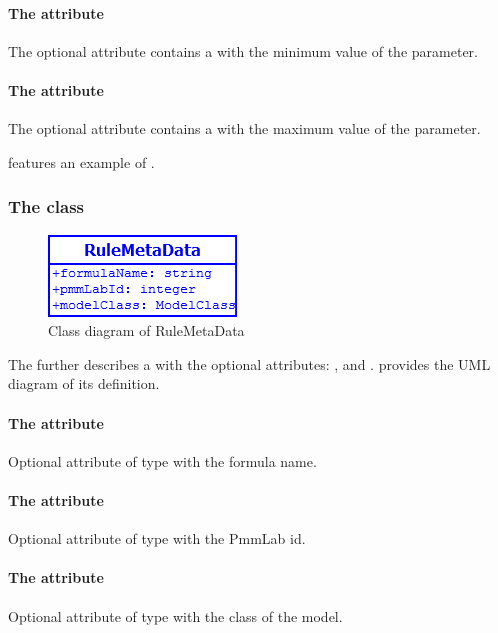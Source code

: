 \paragraph{The  attribute}
The optional attribute  contains a  with the
minimum value of the parameter.

\paragraph{The  attribute}
The optional attribute  contains a  with the
maximum value of the parameter.

 features an example of \ParameterMetaData.


\subsubsection{The  class}
\begin{figure}[h]
	\includegraphics[scale=0.8]{img/RuleMetaData}
	\caption{Class diagram of RuleMetaData}
	\label{RuleMetaData}
\end{figure}

\label{rulemetadata-class}
The \RuleMetaData further describes a \Rule with the optional attributes:
,  and . 
provides the UML diagram of its definition.

\paragraph{The  attribute}
Optional attribute of type  with the formula name.

\paragraph{The  attribute}
Optional attribute of type  with the PmmLab id.

\paragraph{The  attribute}
Optional attribute of type  with the class of the model.


